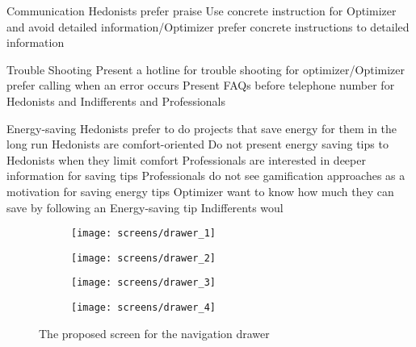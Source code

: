 Communication
	Hedonists prefer praise 
	Use concrete instruction for Optimizer and avoid detailed information/Optimizer prefer concrete instructions to detailed information

Trouble Shooting
	Present a hotline for trouble shooting for optimizer/Optimizer prefer calling when an error occurs
	Present FAQs before telephone number for Hedonists and Indifferents and Professionals

Energy-saving
	Hedonists prefer to do projects that save energy for them in the long run
	Hedonists are comfort-oriented Do not present energy saving tips to Hedonists when they limit comfort
	Professionals are interested in deeper information for saving tips
	Professionals do not see gamification approaches as a motivation for saving energy tips
	Optimizer want to know how much they can save by following an Energy-saving tip
	Indifferents woul






 




\begin{figure}[h]
	\centering
	\begin{subfigure}[b]{0.24\columnwidth}
		\centering
		\texttt{[image: screens/drawer\_1]}
		\label{fig:drawer:professional}
	\end{subfigure}
	\begin{subfigure}[b]{0.24\columnwidth}
		\centering
		\texttt{[image: screens/drawer\_2]}
		\label{fig:drawer:optimizer}
	\end{subfigure}
	\begin{subfigure}[b]{0.24\columnwidth}
		\centering
		\texttt{[image: screens/drawer\_3]}
		\label{fig:drawer:indifferent}
	\end{subfigure}
	\begin{subfigure}[b]{0.24\columnwidth}
		\centering
		\texttt{[image: screens/drawer\_4]}
		\label{fig:drawer:hedonist}
	\end{subfigure}
	\caption{The proposed screen for the navigation drawer}
	\label{fig:drawer} %
\end{figure}

